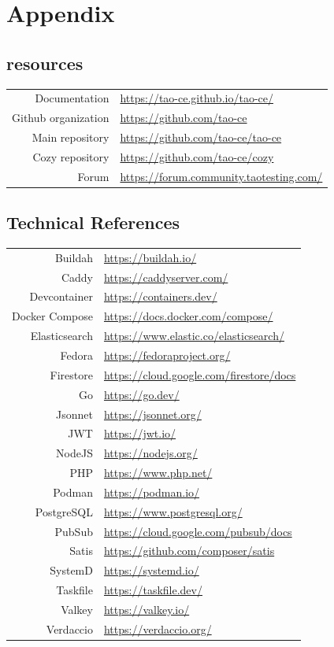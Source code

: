 \section{Appendix}

\subsection{\taoce resources}

\begin{tabular}{r l}
    Documentation & \url{https://tao-ce.github.io/tao-ce/} \\
    Github organization & \url{https://github.com/tao-ce} \\
    Main repository & \url{https://github.com/tao-ce/tao-ce} \\
    Cozy repository & \url{https://github.com/tao-ce/cozy} \\
    Forum & \url{https://forum.community.taotesting.com/} \\
\end{tabular}

\subsection{Technical References}

\begin{tabular}{r l}
    Buildah & \url{https://buildah.io/} \\
    Caddy & \url{https://caddyserver.com/} \\
    Devcontainer & \url{https://containers.dev/} \\
    Docker Compose & \url{https://docs.docker.com/compose/} \\
    Elasticsearch & \url{https://www.elastic.co/elasticsearch/} \\
    Fedora & \url{https://fedoraproject.org/} \\
    Firestore & \url{https://cloud.google.com/firestore/docs} \\
    Go & \url{https://go.dev/} \\
    Jsonnet & \url{https://jsonnet.org/} \\
    JWT & \url{https://jwt.io/} \\
    NodeJS & \url{https://nodejs.org/} \\
    PHP & \url{https://www.php.net/} \\
    Podman & \url{https://podman.io/} \\
    PostgreSQL & \url{https://www.postgresql.org/} \\
    PubSub & \url{https://cloud.google.com/pubsub/docs} \\
    Satis & \url{https://github.com/composer/satis} \\
    SystemD & \url{https://systemd.io/} \\
    Taskfile & \url{https://taskfile.dev/} \\
    Valkey & \url{https://valkey.io/} \\
    Verdaccio & \url{https://verdaccio.org/} \\
\end{tabular}